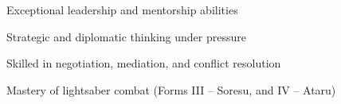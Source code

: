\item Exceptional leadership and mentorship abilities
\item Strategic and diplomatic thinking under pressure
\item Skilled in negotiation, mediation, and conflict resolution
\item Mastery of lightsaber combat (Forms III – Soresu, and IV – Ataru)